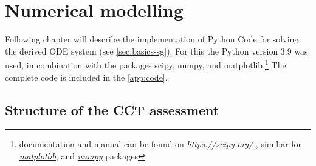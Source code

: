 \chapter{Numerical modelling}
\label{chap:methods}

Following chapter will describe the implementation of Python Code for solving the derived \acs{ODE} system (see \autoref{sec:basics-sg}). For this the Python version 3.9 was used, in combination with the packages scipy, numpy, and matplotlib.\footnote{documentation and manual can be found on \href{https://scipy.org/}{\itshape https://scipy.org/} \autocite{virtanenSciPyFundamentalAlgorithms2020}, similiar for \href{https://matplotlib.org/}{\itshape matplotlib}, and \href{https://numpy.org/}{\itshape numpy} packages} The complete code is included in the \autoref{app:code}. 

\section{Structure of the \acs{CCT} assessment}

